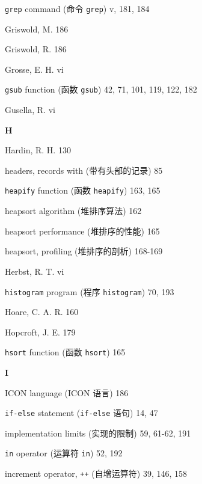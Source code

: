 \begin{multicols}{2}
\hangindent=2pc  \verb'grep' command (命令 \verb'grep') v, 181, 184

\hangindent=2pc  Griswold, M. 186

\hangindent=2pc  Griswold, R. 186

\hangindent=2pc  Grosse, E. H. vi

\hangindent=2pc  \verb'gsub' function (函数 \verb'gsub')
42, 71, 101, 119, 122, 182

\hangindent=2pc  Gusella, R. vi


\medskip\textbf{\large{H}}

\hangindent=2pc  Hardin, R. H. 130

\hangindent=2pc  headers, records with (带有头部的记录) 85

\hangindent=2pc  \verb'heapify' function (函数 \verb'heapify') 163, 165

\hangindent=2pc  heapsort algorithm (堆排序算法) 162

\hangindent=2pc  heapsort performance (堆排序的性能) 165

\hangindent=2pc  heapsort, profiling (堆排序的剖析) 168-169

\hangindent=2pc  Herbst, R. T. vi

\hangindent=2pc  \verb'histogram' program (程序
\verb'histogram') 70, 193

\hangindent=2pc  Hoare, C. A. R. 160

\hangindent=2pc  Hopcroft, J. E. 179

\hangindent=2pc  \verb'hsort' function (函数 \verb'hsort') 165

\medskip\textbf{\large{I}}

\hangindent=2pc  ICON language (ICON 语言) 186

\hangindent=2pc  \verb'if-else' statement (\verb'if-else' 语句) 14, 47

\hangindent=2pc  implementation limits (实现的限制) 59, 61-62, 191

\hangindent=2pc  \verb'in' operator (运算符 \verb'in') 52, 192

\hangindent=2pc  increment operator, \verb'++' (自增运算符) 39, 146, 158


\end{multicols}
